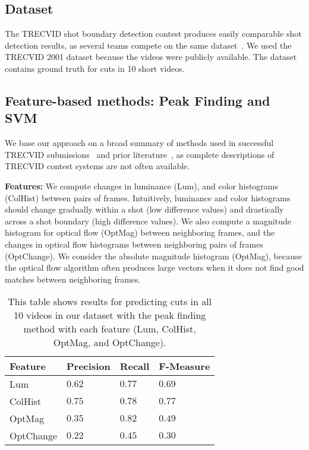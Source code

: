\subsection*{Dataset}
The TRECVID shot boundary detection contest produces easily comparable shot detection results, as several teams compete on the same dataset~\cite{smeaton_video_2010}. 
We used the TRECVID 2001 dataset because the videos were publicly available. The dataset contains ground truth for cuts in 10 short videos.

\subsection*{Feature-based methods: Peak Finding and SVM}
We base our approach on a broad summary of methods used in successful TRECVID submissions~\cite{smeaton_video_2010} and prior literature~\cite{boreczky1996comparison}, as complete descriptions of TRECVID contest systems are not often available. 

\textbf{Features:} We compute changes in luminance (Lum), and color histograms (ColHist) between pairs of frames. Intuitively, luminance and color histograms should change gradually within a shot (low difference values) and drastically across a shot boundary (high difference values). We also compute a magnitude histogram for optical flow (OptMag) between neighboring frames, and the changes in optical flow histograms between neighboring pairs of frames (OptChange). We consider the absolute magnitude histogram (OptMag), because the optical flow algorithm often produces large vectors when it does not find good matches between neighboring frames. 
\\

\begin{table}[h!]
  \begin{center}
  	\small{
	\begin{tabular}{l|lll}
	Feature   & Precision  & Recall     & F-Measure  \\ \hline
	Lum       & $0.62$ & $0.77$ & $0.69 $ \\
	ColHist   & $0.75$ & $0.78$ & $0.77$ \\
	OptMag    & $0.35$ & $0.82$ & $0.49$ \\
	OptChange & $0.22$ & $0.45$ & $0.30$ \\ \hline
	\end{tabular}
	}
  \end{center}
  \label{table:peakresults}
  \caption{This table shows results for predicting cuts in all 10 videos in our dataset with the peak finding method with each feature (Lum, ColHist, OptMag, and OptChange).}
\end{table} 

